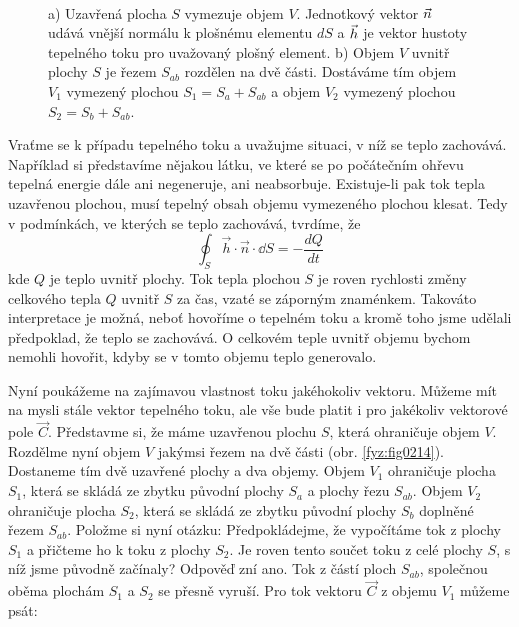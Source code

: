       \begin{figure}[ht!]
        \centering
            \\ 
        \caption{a) Uzavřená plocha $S$ vymezuje objem $V$. Jednotkový vektor $\protect\vec{n}$ udává
                vnější normálu k plošnému elementu $dS$ a $\protect\vec{h}$ je vektor hustoty
                tepelného toku pro uvažovaný plošný element. b) Objem $V$ uvnitř plochy $S$ je řezem
                $S_{ab}$ rozdělen na dvě části. Dostáváme tím objem $V_1$ vymezený plochou
                $S_1=S_a+S_{ab}$ a objem $V_2$ vymezený plochou $S_2=S_b+S_{ab}$.
                \cite[s.~48]{Feynman02}}
      \end{figure}
      
      Vraťme se k případu tepelného toku a uvažujme situaci, v níž se teplo zachovává. Například si
      představíme nějakou látku, ve které se po počátečním ohřevu tepelná energie dále ani
      negeneruje, ani neabsorbuje. Existuje-li pak tok tepla uzavřenou plochou, musí tepelný obsah
      objemu vymezeného plochou klesat. Tedy v podmínkách, ve kterých se teplo zachovává, tvrdíme,
      že
      \begin{equation}\label{fyz:eq_int_fey_dQ}
        \oint_S\vec{h}\cdot\vec{n}\cdot\dd{S} = - \frac{dQ}{dt}
      \end{equation}
      kde $Q$ je teplo uvnitř plochy. Tok tepla plochou $S$ je roven rychlosti změny celkového tepla 
      $Q$ uvnitř $S$ za čas, vzaté se záporným znaménkem. Takováto interpretace je možná, neboť 
      hovoříme o tepelném toku a kromě toho jsme udělali předpoklad, že teplo se zachovává. O 
      celkovém teple uvnitř objemu bychom nemohli hovořit, kdyby se v tomto objemu teplo generovalo.
      
      Nyní poukážeme na zajímavou vlastnost toku jakéhokoliv vektoru. Můžeme mít na mysli stále
      vektor tepelného toku, ale vše bude platit i pro jakékoliv vektorové pole $\vec{C}$.
      Představme si, že máme uzavřenou plochu $S$, která ohraničuje objem $V$. Rozdělme nyní objem
      $V$ jakýmsi řezem na dvě části (obr. \ref{fyz:fig0214}). Dostaneme tím dvě uzavřené plochy a
      dva objemy. Objem $V_1$ ohraničuje plocha $S_1$, která se skládá ze zbytku původní plochy
      $S_a$ a plochy řezu $S_{ab}$. Objem $V_2$ ohraničuje plocha $S_2$, která se skládá ze zbytku
      původní plochy $S_b$ doplněné řezem $S_{ab}$. Položme si nyní otázku: Předpokládejme, že
      vypočítáme tok z plochy $S_1$ a přičteme ho k toku z plochy $S_2$. Je roven tento součet toku
      z celé plochy $S$, s níž jsme původně začínaly? Odpověď zní ano. Tok z částí ploch $S_{ab}$,
      společnou oběma plochám $S_1$ a $S_2$ se přesně vyruší. Pro tok vektoru $\vec{C}$ z objemu
      $V_1$ můžeme psát:
        
